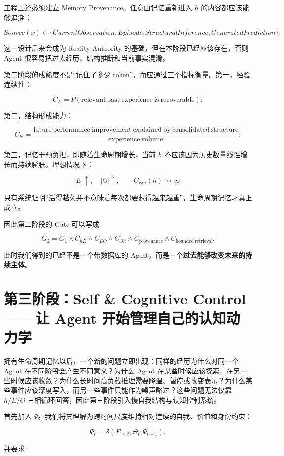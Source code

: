 工程上还必须建立 Memory Provenance。任意由记忆重新进入 \(h\) 的内容都应该能够追溯：

\[
Source(x)
\in
\{
CurrentObservation,
Episode,
StructuralInference,
GeneratedPrediction
\}.
\]

这一设计后来会成为 Reality Authority 的基础，但在本阶段已经应该存在，否则 Agent 很容易把过去经历、结构推断和当前事实混淆。

第二阶段的成熟度不是“记住了多少 token”，而应通过三个指标衡量。第一，经验连续性：

\[
C_E
=
P(\mathrm{relevant\ past\ experience\ is\ recoverable});
\]

第二，结构形成能力：

\[
C_\Theta
=
\frac{
\mathrm{future\ performance\ improvement\ explained\ by\ consolidated\ structure}
}{
\mathrm{experience\ volume}
};
\]

第三，记忆干预负担，即随着生命周期增长，当前 \(h\) 不应该因为历史数量线性增长而持续膨胀。理想情况下：

\[
|E|\uparrow,\quad
|\Theta|\uparrow,
\qquad
C_{run}(h)
\nrightarrow
\infty.
\]

只有系统证明“活得越久并不意味着每次都要想得越来越重”，生命周期记忆才真正成立。

因此第二阶段的 Gate 可以写成

\[
G_2
=
G_1
\land
C_{hE}
\land
C_{E\Theta}
\land
C_{\Theta h}
\land
C_{\mathrm{provenance}}
\land
C_{\mathrm{bounded\ retrieval}}.
\]

此时我们得到的已经不是一个带数据库的 Agent，而是一个\textbf{过去能够改变未来的持续主体}。

\section{第三阶段：Self \& Cognitive Control——让 Agent 开始管理自己的认知动力学}

拥有生命周期记忆以后，一个新的问题立即出现：同样的经历为什么对同一个 Agent 在不同阶段会产生不同意义？为什么 Agent 在某些时候应该探索，在另一些时候应该收敛？为什么长时间高负载推理需要降温、暂停或改变表示？为什么某些事件应该深度写入，而另一些事件只能作为噪声略过？这些问题无法仅靠 \(h/E/\Theta\) 三相循环回答，因此第三阶段引入慢自我结构与认知控制系统。

首先加入 \(\Psi\)。我们将其理解为跨时间尺度维持相对连续的自我、价值和身份约束：

\[
\Psi_t
=
\mathcal S
(E_{\leq t},\Theta_t,\Psi_{t-1}),
\]

并要求

